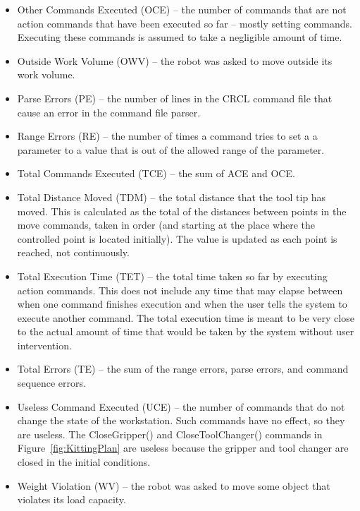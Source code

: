 \begin{itemize}
\item \sf Other Commands Executed (OCE) \rm -- the number of commands that are
  not action commands that have been executed so far -- mostly setting
  commands. Executing these commands is assumed to take a negligible amount
  of time.\\

\item \sf Outside Work Volume (OWV) \rm -- the robot was asked to move outside its
  work volume.\\

\item \sf Parse Errors  (PE) \rm -- the number of lines in the CRCL command file
  that cause an error in the command file parser. \\

\item \sf Range Errors (RE) \rm -- the number of times a command tries to set a
  a parameter to a value that is out of the allowed range of the parameter.\\

 \item \sf Total Commands Executed (TCE) \rm -- the sum of ACE and OCE.\\

\item \sf Total Distance Moved (TDM) \rm -- the total distance that the
  tool tip has moved.  This is calculated as the total of the distances between
  points in
  the move commands, taken in order (and starting at the place where the
  controlled point is located initially). The value is updated as each point
  is reached, not continuously.\\

\item \sf Total Execution Time (TET) \rm -- the total time taken so far by
  executing action commands. This does not include any time that may elapse
  between when one command finishes execution and when the user tells the
  system to execute another command. The total execution time is
  meant to be very close to the actual amount of time that would be taken
  by the system without user intervention.\\

\item \sf Total Errors (TE) \rm -- the sum of the range errors, parse errors,
  and command sequence errors.\\

\item \sf Useless Command Executed (UCE) \rm -- the number of commands that do
  not change the state of the workstation. Such commands have no effect, so
  they are useless. The \sf CloseGripper() \rm and \sf CloseToolChanger()
  \rm commands in Figure~\ref{fig:KittingPlan} are useless because the
  gripper and tool changer are closed in the initial conditions.\\

\item \sf Weight Violation (WV) \rm -- the robot was asked to move some object that
  violates its load capacity.

\end{itemize}

